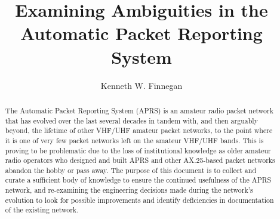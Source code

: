 \documentclass{ucthesis}
\begin{document}
\title{Examining Ambiguities in the Automatic Packet Reporting System}
\author{Kenneth W. Finnegan}
  
 
  
 
 
\maketitle

\begin{frontmatter}

\copyrightpage
\committeemembershippage

\begin{abstract}
The Automatic Packet Reporting System (APRS) is an amateur radio packet 
network that has evolved over the last several decades in tandem with, 
and then arguably beyond, the lifetime of other VHF/UHF amateur packet
networks, to the point where it is one of very few packet networks left
on the amateur VHF/UHF bands. This is proving to be problematic due to
the loss of institutional knowledge as older amateur radio operators who
designed and built APRS and other AX.25-based packet networks abandon
the hobby or pass away. The purpose of this document is to 
collect and curate a sufficient body of knowledge to ensure the 
continued usefulness of the APRS network, and re-examining 
the engineering decisions made during the network's evolution to look for
possible improvements and identify deficiencies in documentation of
the existing network.
\end{abstract}

\tableofcontents
\listoffigures
\end{frontmatter}








\begin{appendices}


\end{appendices}


\end{document}
